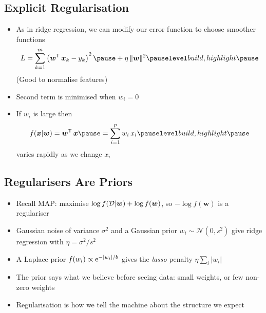 \Outline %

\begin{slide}
\section[-2]{Explicit Regularisation}

\begin{PauseHighLight}
  \begin{itemize}
  \item As in ridge regression, we can modify our error function to
    choose smoother functions
    \begin{align*}
      L = \sum_{k=1}^m \left( \bm{w}^\tr \, \bm{x}_k - y_k \right)^2\pause
      + \eta \, \|\bm{w}\|^2\pauseb
    \end{align*}
    (Good to normalise features)\pauseb
  \item Second term is minimised when $w_i=0$\pause
  \item If $w_i$ is large then
    \begin{align*}
      f(\bm{x}|\bm{w})= \bm{w}^\tr \, \bm{x}\pause = \sum_{i=1}^p
      w_i \, x_{i}\pauseb
    \end{align*}
    varies rapidly as we change $x_i$\pause    
  \end{itemize}
\end{PauseHighLight}

\end{slide}


\begin{slide}
\section[-1]{Regularisers Are Priors}

\begin{PauseHighLight}
  \begin{itemize}
  \item Recall MAP: maximise $\log f(\mathcal{D}|\bm{w}) + \log f(\bm{w})$, so
    $-\log f(\bm{w})$ is a regulariser\pause
  \item Gaussian noise of variance $\sigma^2$ and a Gaussian prior
    $w_i\sim\mathcal{N}(0,s^2)$ give ridge regression with
    $\eta = \sigma^2/s^2$\pause
  \item A Laplace prior $f(w_i)\propto{\rm e}^{-|w_i|/b}$ gives the
    \emph{lasso} penalty $\eta\sum_i|w_i|$\pause
  \item The prior says what we believe before seeing data: small
    weights, or few non-zero weights\pause
  \item Regularisation is how we tell the machine about the structure
    we expect\pause
  \end{itemize}
\end{PauseHighLight}

\end{slide}


